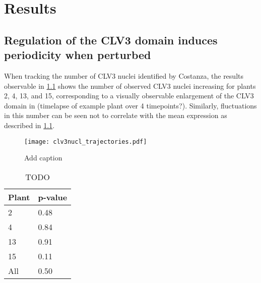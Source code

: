 
\chapter{Results}

\ifpdf
    \graphicspath{{Chapter3/Figs/Raster/}{Chapter3/Figs/PDF/}{Chapter3/Figs/}}
\else
    \graphicspath{{Chapter3/Figs/Vector/}{Chapter3/Figs/}}
\fi

\section{Regulation of the CLV3 domain induces periodicity when perturbed}
When tracking the number of CLV3 nuclei identified by Costanza, the results
observable in \cref{fig:clv3_trajs} shows the number of observed CLV3 nuclei
increasing for plants 2, 4, 13, and 15, corresponding to a visually observable
enlargement of the CLV3 domain in \FIG (timelapse of example plant over 4
timepoints?). Similarly, fluctuations in this number can be seen not to 
correlate with the mean expression as described in
\cref{tab:corr_nNucl_meanExpr}. %

\begin{figure}[H]
  \centering
  \texttt{[image: clv3nucl\_trajectories.pdf]}
  \caption{Add caption}
  \label{fig:clv3_trajs}
\end{figure}

\begin{table}
  \centering
  \caption{TODO}
  \label{tab:corr_nNucl_meanExpr}
  \begin{tabular}{ll}  \toprule
    Plant & p-value \\ \midrule
    2     & 0.48    \\
    4     & 0.84    \\
    13    & 0.91    \\
    15    & 0.11    \\ \midrule
    All   & 0.50    \\ \bottomrule
  \end{tabular}
\end{table}


